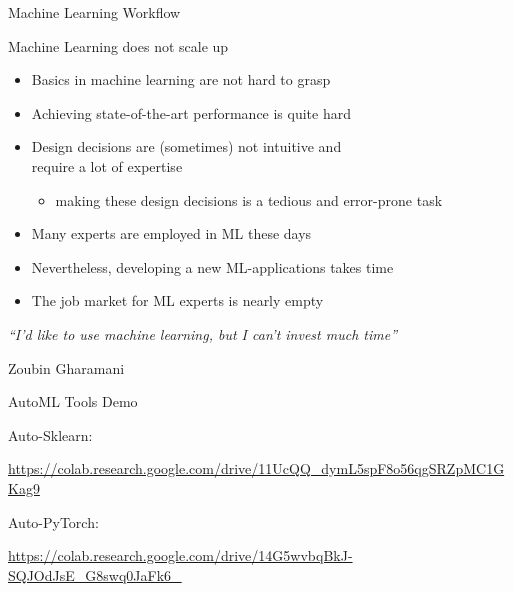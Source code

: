 \begin{frame}[c]{Machine Learning Workflow}

\centering


\pause
 
\bigskip
\bigskip
{}

\end{frame}
\begin{frame}[c]{Machine Learning does not scale up}

\begin{itemize}
  \item Basics in machine learning are not hard to grasp
  \smallskip
  \pause
  \item Achieving state-of-the-art performance is quite hard
  \smallskip
  \pause
  \item Design decisions are (sometimes) not intuitive and\\ require a lot of expertise
  \begin{itemize}
    \item making these design decisions is a tedious and error-prone task
  \end{itemize}
  \pause
  \smallskip
  \item Many experts are employed in ML these days
  \smallskip
  \pause
  \item Nevertheless, developing a new ML-applications takes time
  \smallskip
  \item The job market for ML experts is nearly empty
\end{itemize}

\bigskip

\textit{``I'd like to use machine learning, but I can't invest much time''}

\hfill Zoubin Gharamani


\end{frame}
\begin{frame}[c]{AutoML Tools Demo}

Auto-Sklearn:

\url{https://colab.research.google.com/drive/11UcQQ_dymL5spF8o56qgSRZpMC1GKag9}

\bigskip
Auto-PyTorch:

\url{https://colab.research.google.com/drive/14G5wvbqBkJ-SQJOdJsE_G8swq0JaFk6_}


\end{frame}
